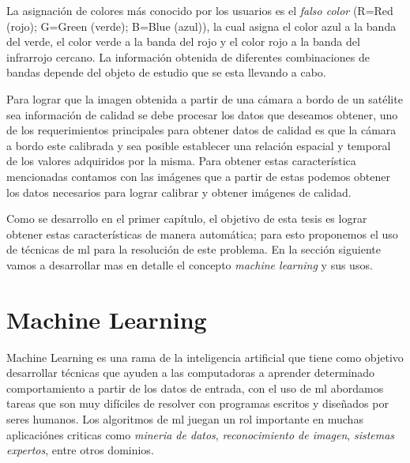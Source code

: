 La asignación de colores más conocido por los usuarios es el \textit{falso color} (R=Red (rojo); G=Green (verde); B=Blue (azul)), la cual asigna el color azul a la banda del verde, el color verde a la banda del rojo y el color rojo a la banda del infrarrojo cercano. La información obtenida de diferentes combinaciones de bandas depende del objeto de estudio que se esta llevando a cabo.


Para lograr que la imagen obtenida a partir de una cámara a bordo de un satélite sea información de calidad se debe procesar los datos que deseamos obtener, uno de los requerimientos principales para obtener datos de calidad es que la cámara a bordo este calibrada y sea posible establecer una relación espacial y temporal de los valores adquiridos por la misma. Para obtener estas característica mencionadas contamos con las imágenes que a partir de estas podemos obtener los datos necesarios para lograr calibrar y obtener imágenes de calidad. 

Como se desarrollo en el primer capítulo, el objetivo de esta tesis es lograr obtener estas características de manera automática; para esto proponemos el uso de técnicas de \ac{ml} para la resolución de este problema. En la sección siguiente vamos a desarrollar mas en detalle  el concepto \textit{machine learning} y sus usos.




\section{Machine Learning}\label{sec:machinelaerning}

Machine Learning es una rama de la inteligencia artificial que tiene como objetivo desarrollar técnicas que ayuden a las computadoras a aprender determinado comportamiento a partir de los datos de entrada, con el uso de \ac{ml} abordamos tareas que son muy difíciles de resolver con programas escritos y diseñados por seres humanos. Los algoritmos de \ac{ml} juegan un rol importante en muchas aplicaciónes criticas como \textit{mineria de datos}, \textit{reconocimiento de imagen}, \textit{sistemas expertos}, entre otros dominios.

